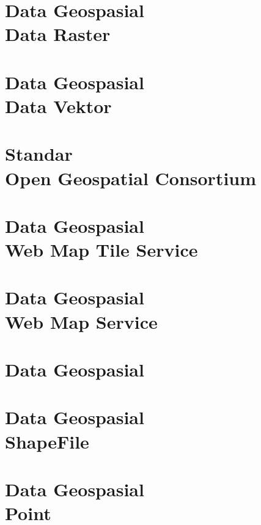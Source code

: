 \documentclass{WileySix}
\begin{document}
\chapter[Data Raster]
{Data Geospasial\\ Data Raster}



\chapter[Data Vektor]
{Data Geospasial\\ Data Vektor}


\chapter[Open Geospatial Consortium]
{Standar\\ Open Geospatial Consortium}


\chapter[Web Map Tile Service]
{Data Geospasial\\ Web Map Tile Service}


\chapter[Web Map Service]
{Data Geospasial\\ Web Map Service}


\chapter[Data Vektor Line]
{Data Geospasial}


\chapter[Shapefile]
{Data Geospasial\\ ShapeFile}



\chapter[Shapefile Point]
{Data Geospasial\\ Point}

\end{document}
